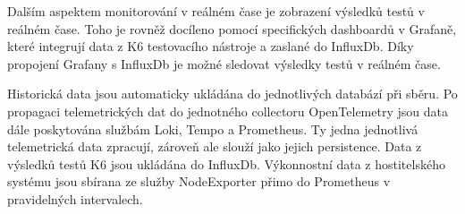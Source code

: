 Dalším aspektem monitorování v reálném čase je zobrazení výsledků testů v reálném čase. Toho je rovněž docíleno pomocí specifických dashboardů v Grafaně, které integrují data z K6 testovacího nástroje a zaslané do InfluxDb. Díky propojení Grafany s InfluxDb je možné sledovat výsledky testů v reálném čase.


Historická data jsou automaticky ukládána do jednotlivých databází při sběru. Po propagaci telemetrických dat do jednotného collectoru OpenTelemetry jsou data dále poskytována službám Loki, Tempo a Prometheus. Ty jedna jednotlivá telemetrická data zpracují, zároveň ale slouží jako jejich persistence. Data z výsledků testů K6 jsou ukládána do InfluxDb. Výkonnostní data z hostitelského systému jsou sbírana ze služby NodeExporter přimo do Prometheus v pravidelných intervalech.
